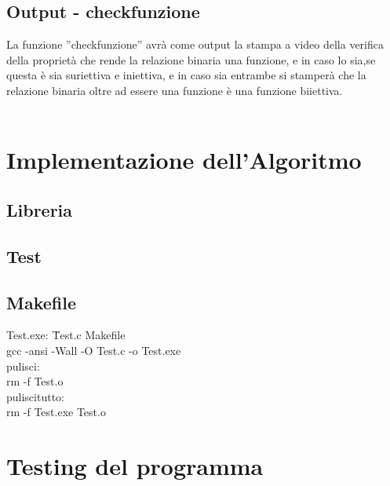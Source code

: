 \documentclass[11pt, a4paper, titlepage, block]{article}
\begin{document}
	\subsection{Output - check\textunderscore funzione}
	La funzione ”check\textunderscore funzione” avr\`a  come output la stampa a video della verifica della propriet\`a  che rende la relazione binaria una funzione, e in caso lo sia,se questa \`e  sia suriettiva e iniettiva, e in caso sia entrambe si stamper\`a  che la relazione binaria oltre ad essere una funzione \`e  una funzione biiettiva.\\
	\\
	\newpage
	\section{Implementazione dell'Algoritmo}
	\subsection{Libreria}
	\lstset{numbers=left, tabsize=2,breaklines=true, language=C}
	 
	\newpage
	\subsection{Test}
	\lstset{numbers=left, tabsize=2,breaklines=true, language=C}
	
	\newpage
\subsection{Makefile}
\begin{tabbing}
	Test.exe: \=Test.c Makefile\\
	\>gcc -ansi -Wall -O Test.c -o Test.exe\\
	pulisci:\\
	\>rm -f Test.o\\
	pulisci\textunderscore tutto:\\
	\>rm -f Test.exe Test.o\\
\end{tabbing}
	
	
	
	
	
	
	
	\newpage
	\section{Testing del programma}
\end{document}
